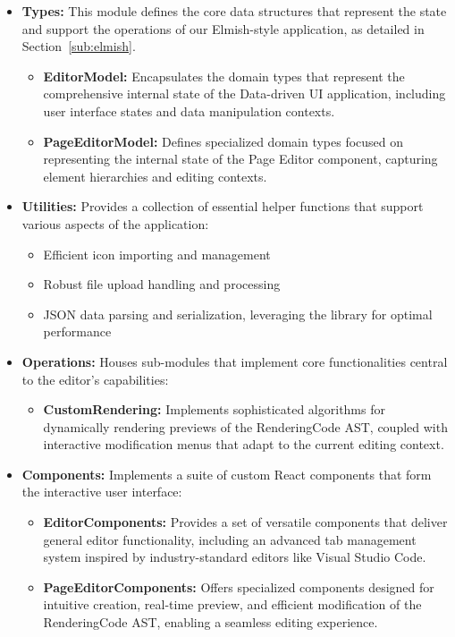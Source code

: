 \begin{itemize}
    \item \textbf{Types:} This module defines the core data structures that represent the state and support the operations of our Elmish-style application, as detailed in Section~\ref{sub:elmish}.
        \begin{itemize}
            \item \textbf{EditorModel:} Encapsulates the domain types that represent the comprehensive internal state of the Data-driven UI application, including user interface states and data manipulation contexts.
            \item \textbf{PageEditorModel:} Defines specialized domain types focused on representing the internal state of the Page Editor component, capturing element hierarchies and editing contexts.
        \end{itemize}

    \item \textbf{Utilities:} Provides a collection of essential helper functions that support various aspects of the application:
        \begin{itemize}
            \item Efficient icon importing and management
            \item Robust file upload handling and processing
            \item JSON data parsing and serialization, leveraging the \citet{simpleJson} library for optimal performance
        \end{itemize}

    \item \textbf{Operations:} Houses sub-modules that implement core functionalities central to the editor's capabilities:
        \begin{itemize}
            \item \textbf{CustomRendering:} Implements sophisticated algorithms for dynamically rendering previews of the RenderingCode AST, coupled with interactive modification menus that adapt to the current editing context.
        \end{itemize}

    \item \textbf{Components:} Implements a suite of custom React components that form the interactive user interface:
        \begin{itemize}
            \item \textbf{EditorComponents:} Provides a set of versatile components that deliver general editor functionality, including an advanced tab management system inspired by industry-standard editors like Visual Studio Code.
            \item \textbf{PageEditorComponents:} Offers specialized components designed for intuitive creation, real-time preview, and efficient modification of the RenderingCode AST, enabling a seamless editing experience.
        \end{itemize}
\end{itemize}

